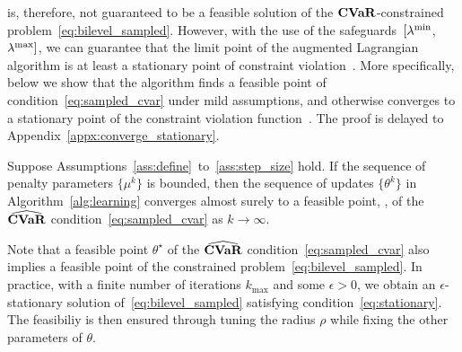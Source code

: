 is, therefore, not guaranteed to be a feasible solution of the $\mathop{\bf CVaR}$-constrained problem~\eqref{eq:bilevel_sampled}. 
However, with the use of the safeguards~$[\lambda^{\rm{min}}$, $\lambda^{\rm{max}}]$, we can guarantee that the limit point of the augmented Lagrangian algorithm is at least a stationary point of constraint violation~\cite[Theorem 6.3]{auglag_safe}.  
More specifically, below we show that the algorithm finds a feasible point of condition~\eqref{eq:sampled_cvar} under mild assumptions, and otherwise converges to a stationary point of the constraint violation function~. 
The proof is delayed to Appendix~\ref{appx:converge_stationary}. 
\begin{theorem}
\label{thm:convergence}
Suppose Assumptions~\ref{ass:define}~to~\ref{ass:step_size} hold.
If the sequence of penalty parameters $\{\mu^k\}$ is bounded, then the sequence of updates $\{\theta^k\}$ in Algorithm~\ref{alg:learning} converges almost surely to a feasible point, \RC{$\theta^\star$}, of the $\widehat{\mathop{\bf CVaR}}$ condition~\eqref{eq:sampled_cvar} as $k\to\infty$.  %
\end{theorem}
Note that a feasible point $\theta^\star$ of the $\widehat{\mathop{\bf CVaR}}$ condition~\eqref{eq:sampled_cvar} also implies a feasible point of the constrained problem~\eqref{eq:bilevel_sampled}. 
In practice, with a finite number of iterations $k_{\text{max}}$ and some $\epsilon > 0$, we obtain an $\epsilon$-stationary solution of~\eqref{eq:bilevel_sampled} satisfying condition~\eqref{eq:stationary}. The feasibiliy is then ensured through tuning the radius $\rho$ while fixing the other parameters of $\theta$.

